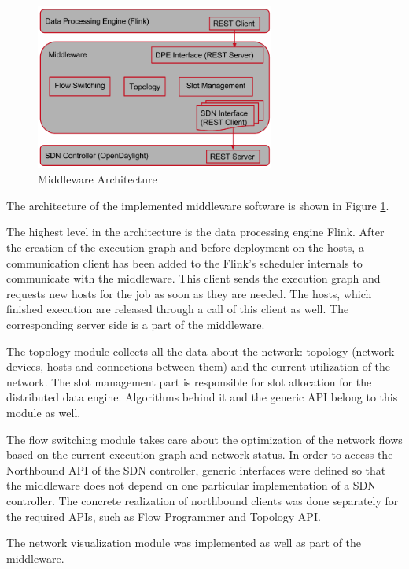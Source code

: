 \begin{figure}[h]
    \centering
    \includegraphics[width=0.7\textwidth]{graphics/architecture.png}
    \caption{Middleware Architecture}
    \label{fig:architecture}
\end{figure}

The architecture of the implemented middleware software is shown in Figure \ref{fig:architecture}.

The highest level in the architecture is the data processing engine Flink. After the creation of the
execution graph and before deployment on the hosts, a communication client has been added to the
Flink's scheduler internals to communicate with the middleware. This client sends the execution
graph and requests new hosts for the job as soon as they are needed. The hosts, which finished
execution are released through a call of this client as well. The corresponding server side is a
part of the middleware.

The topology module collects all the data about the network: topology (network devices, hosts and
connections between them) and the current utilization of the network. The slot management part is
responsible for slot allocation for the distributed data engine. Algorithms behind it and the
generic API belong to this module as well.

The flow switching module takes care about the optimization of the network flows based on the
current execution graph and network status. In order to access the Northbound API of the SDN
controller, generic interfaces were defined so that the middleware does not depend on one particular
implementation of a SDN controller. The concrete realization of northbound clients was done
separately for the required APIs, such as Flow Programmer and Topology API.

The network visualization module was implemented as well as part of the middleware.

